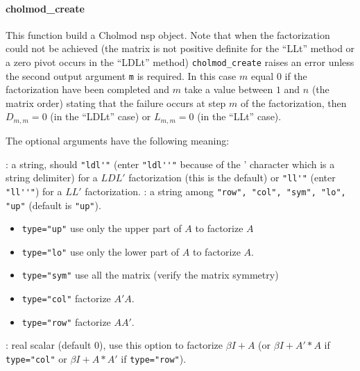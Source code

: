 \paragraph{cholmod\_create}
This function build a Cholmod nsp object. Note that when the factorization could not
be achieved (the matrix is not positive definite for the ``LLt'' method or a zero
pivot occurs in the ``LDLt'' method) \verb+cholmod_create+ raises an error unless 
the second output argument \verb+m+ is required. In this case $m$ equal $0$ if the factorization 
have been completed and $m$ take a value between $1$ and $n$ (the matrix order) stating
that the failure occurs at step $m$ of the factorization, then $D_{m,m}=0$ (in the ``LDLt''
case) or $L_{m,m}=0$  (in the ``LLt'' case).
 
The optional arguments have the following meaning:
\begin{varlist}
  : a string, should \verb+"ldl'"+ (enter \verb+"ldl''"+ because of the ' character which is
   a string delimiter) for a $LDL'$ factorization (this is the default)
                or \verb+"ll'"+ (enter  \verb+"ll''"+) for a $LL'$ factorization.
  : a string among \verb+"row", "col", "sym", "lo", "up"+ (default is \verb+"up"+).
     \begin{itemize} 
        \item \verb+type="up"+ use only the upper part of $A$ to factorize $A$
        \item  \verb+type="lo"+ use only the lower part of $A$ to factorize $A$.
        \item  \verb+type="sym"+ use all the matrix (verify the matrix symmetry)
        \item  \verb+type="col"+ factorize $A'A$.
        \item  \verb+type="row"+ factorize $AA'$.
     \end{itemize}

  : real scalar (default 0), use this option to factorize $\beta I + A$ (or $\beta I + A'*A$ if \verb+type="col"+
                or $\beta I + A*A'$ if \verb+type="row"+).


\end{varlist}
